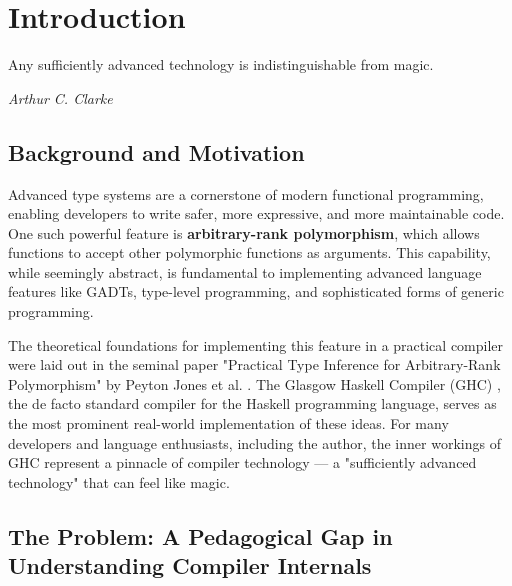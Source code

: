 \chapter{Introduction}
\label{chap:Introduction}

\epigraph{Any sufficiently advanced technology is indistinguishable from magic.}{\textit{Arthur C. Clarke}}

\section{Background and Motivation}

Advanced type systems are a cornerstone of modern functional programming, enabling developers to write safer, more expressive, and more maintainable code. One such powerful feature is \textbf{arbitrary-rank polymorphism}, which allows functions to accept other polymorphic functions as arguments. This capability, while seemingly abstract, is fundamental to implementing advanced language features like GADTs, type-level programming, and sophisticated forms of generic programming.

The theoretical foundations for implementing this feature in a practical compiler were laid out in the seminal paper "Practical Type Inference for Arbitrary-Rank Polymorphism" by Peyton Jones et al. \cite{jones-practical-2007}. The Glasgow Haskell Compiler (GHC) \cite{ghc-site-2025}, the de facto standard compiler for the Haskell programming language, serves as the most prominent real-world implementation of these ideas. For many developers and language enthusiasts, including the author, the inner workings of GHC represent a pinnacle of compiler technology --- a "sufficiently advanced technology" that can feel like magic.

\section{The Problem: A Pedagogical Gap in Understanding Compiler Internals}


